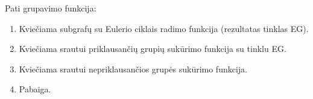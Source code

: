 Pati grupavimo funkcija:
\begin{enumerate}
	\item Kviečiama subgrafų su Eulerio ciklais radimo funkcija (rezultatas tinklas EG).
	\item Kviečiama srautui priklausančių grupių sukūrimo funkcija su tinklu EG.
	\item Kviečiama srautui nepriklausančios grupės sukūrimo funkcija.
	\item Pabaiga.
\end{enumerate}
